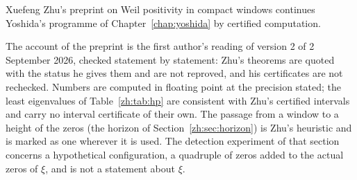 \label{chap:zhu}\label{zh:chapter}

Xuefeng Zhu's preprint on Weil positivity in compact windows \cite{Zhu26} continues Yoshida's programme of Chapter~\ref{chap:yoshida} by certified computation.

The account of the preprint is the first author's reading of version 2 of 2 September 2026, checked statement by statement: Zhu's theorems are quoted with the status he gives them and are not reproved, and his certificates are not rechecked. Numbers are computed in floating point at the precision stated; the least eigenvalues of Table~\ref{zh:tab:hp} are consistent with Zhu's certified intervals and carry no interval certificate of their own. The passage from a window to a height of the zeros (the horizon of Section~\ref{zh:sec:horizon}) is Zhu's heuristic and is marked as one wherever it is used. The detection experiment of that section concerns a hypothetical configuration, a quadruple of zeros added to the actual zeros of $\xi$, and is not a statement about $\xi$.
